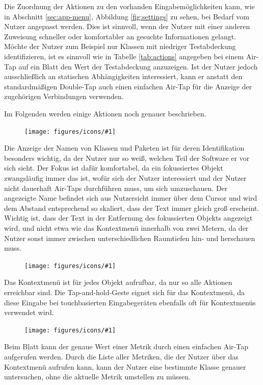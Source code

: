 Die Zuordnung der Aktionen zu den vorhanden Eingabemöglichkeiten kann, wie in Abschnitt \ref{sec:app-menu}, Abbildung \ref{fig:settings} zu sehen, bei Bedarf vom Nutzer angepasst werden. Dies ist sinnvoll, wenn der Nutzer mit einer anderen Zuweisung schneller oder komfortabler an gesuchte Informationen gelangt. Möchte der Nutzer zum Beispiel nur Klassen mit niedriger Testabdeckung identifizieren, ist es sinnvoll wie in Tabelle \ref{tab:actions} angegeben bei einem Air-Tap auf ein Blatt den Wert der Testabdeckung anzuzeigen. Ist der Nutzer jedoch ausschließlich an statischen Abhängigkeiten interessiert, kann er anstatt den standardmäßigen Double-Tap auch einen einfachen Air-Tap für die Anzeige der zugehörigen Verbindungen verwenden.

Im Folgenden werden einige Aktionen noch genauer beschrieben. \\

\newcommand{\inlineicon}[1]{
  \setlength\intextsep{0pt}
  \begin{figure}
    \vspace{-2px}
    \texttt{[image: figures/icons/\#1]}
  \end{figure}
}

\begingroup

\inlineicon{info}\noindent Die Anzeige der Namen von Klassen und Paketen ist für deren Identifikation besonders wichtig, da der Nutzer nur so weiß, welchen Teil der Software er vor sich sieht. Der Fokus ist dafür komfortabel, da ein fokussiertes Objekt zwangsläufig immer das ist, wofür sich der Nutzer interessiert und der Nutzer nicht dauerhaft Air-Taps durchführen muss, um sich umzuschauen. Der angezeigte Name befindet sich aus Nutzersicht immer über dem Cursor und wird dem Abstand entsprechend so skaliert, dass der Text immer gleich groß erscheint. Wichtig ist, dass der Text in der Entfernung des fokussierten Objekts angezeigt wird, und nicht etwa wie das Kontextmenü innerhalb von zwei Metern, da der Nutzer sonst immer zwischen unterschiedlichen Raumtiefen hin- und herschauen muss.\\

\inlineicon{context-menu}\noindent Das Kontextmenü ist für jedes Objekt aufrufbar, da nur so alle Aktionen erreichbar sind. Die Tap-and-hold-Geste eignet sich für das Kontextmenü, da diese Eingabe bei touchbasierten Eingabegeräten ebenfalls oft für Kontextmenüs verwendet wird.\\

\inlineicon{metric}\noindent Beim Blatt kann der genaue Wert einer Metrik durch einen einfachen Air-Tap aufgerufen werden. Durch die Liste aller Metriken, die der Nutzer über das Kontextmenü aufrufen kann, kann der Nutzer eine bestimmte Klasse genauer untersuchen, ohne die aktuelle Metrik umstellen zu müssen.\\

